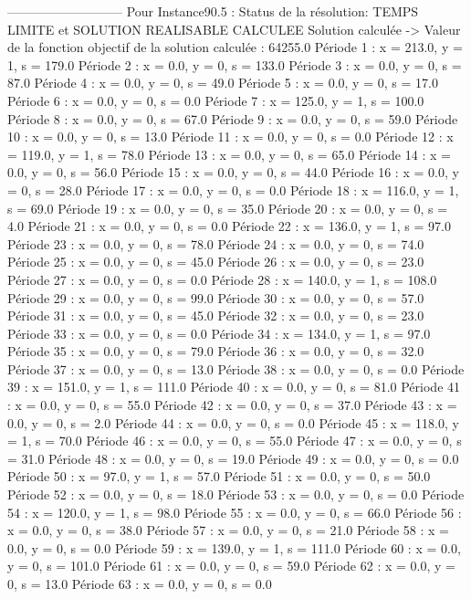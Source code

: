 ---------------------------
Pour Instance90.5  :
Status de la résolution: TEMPS LIMITE et SOLUTION REALISABLE CALCULEE
Solution calculée
-> Valeur de la fonction objectif de la solution calculée :  64255.0
Période 1 : x = 213.0, y = 1, s = 179.0
Période 2 : x = 0.0, y = 0, s = 133.0
Période 3 : x = 0.0, y = 0, s = 87.0
Période 4 : x = 0.0, y = 0, s = 49.0
Période 5 : x = 0.0, y = 0, s = 17.0
Période 6 : x = 0.0, y = 0, s = 0.0
Période 7 : x = 125.0, y = 1, s = 100.0
Période 8 : x = 0.0, y = 0, s = 67.0
Période 9 : x = 0.0, y = 0, s = 59.0
Période 10 : x = 0.0, y = 0, s = 13.0
Période 11 : x = 0.0, y = 0, s = 0.0
Période 12 : x = 119.0, y = 1, s = 78.0
Période 13 : x = 0.0, y = 0, s = 65.0
Période 14 : x = 0.0, y = 0, s = 56.0
Période 15 : x = 0.0, y = 0, s = 44.0
Période 16 : x = 0.0, y = 0, s = 28.0
Période 17 : x = 0.0, y = 0, s = 0.0
Période 18 : x = 116.0, y = 1, s = 69.0
Période 19 : x = 0.0, y = 0, s = 35.0
Période 20 : x = 0.0, y = 0, s = 4.0
Période 21 : x = 0.0, y = 0, s = 0.0
Période 22 : x = 136.0, y = 1, s = 97.0
Période 23 : x = 0.0, y = 0, s = 78.0
Période 24 : x = 0.0, y = 0, s = 74.0
Période 25 : x = 0.0, y = 0, s = 45.0
Période 26 : x = 0.0, y = 0, s = 23.0
Période 27 : x = 0.0, y = 0, s = 0.0
Période 28 : x = 140.0, y = 1, s = 108.0
Période 29 : x = 0.0, y = 0, s = 99.0
Période 30 : x = 0.0, y = 0, s = 57.0
Période 31 : x = 0.0, y = 0, s = 45.0
Période 32 : x = 0.0, y = 0, s = 23.0
Période 33 : x = 0.0, y = 0, s = 0.0
Période 34 : x = 134.0, y = 1, s = 97.0
Période 35 : x = 0.0, y = 0, s = 79.0
Période 36 : x = 0.0, y = 0, s = 32.0
Période 37 : x = 0.0, y = 0, s = 13.0
Période 38 : x = 0.0, y = 0, s = 0.0
Période 39 : x = 151.0, y = 1, s = 111.0
Période 40 : x = 0.0, y = 0, s = 81.0
Période 41 : x = 0.0, y = 0, s = 55.0
Période 42 : x = 0.0, y = 0, s = 37.0
Période 43 : x = 0.0, y = 0, s = 2.0
Période 44 : x = 0.0, y = 0, s = 0.0
Période 45 : x = 118.0, y = 1, s = 70.0
Période 46 : x = 0.0, y = 0, s = 55.0
Période 47 : x = 0.0, y = 0, s = 31.0
Période 48 : x = 0.0, y = 0, s = 19.0
Période 49 : x = 0.0, y = 0, s = 0.0
Période 50 : x = 97.0, y = 1, s = 57.0
Période 51 : x = 0.0, y = 0, s = 50.0
Période 52 : x = 0.0, y = 0, s = 18.0
Période 53 : x = 0.0, y = 0, s = 0.0
Période 54 : x = 120.0, y = 1, s = 98.0
Période 55 : x = 0.0, y = 0, s = 66.0
Période 56 : x = 0.0, y = 0, s = 38.0
Période 57 : x = 0.0, y = 0, s = 21.0
Période 58 : x = 0.0, y = 0, s = 0.0
Période 59 : x = 139.0, y = 1, s = 111.0
Période 60 : x = 0.0, y = 0, s = 101.0
Période 61 : x = 0.0, y = 0, s = 59.0
Période 62 : x = 0.0, y = 0, s = 13.0
Période 63 : x = 0.0, y = 0, s = 0.0
